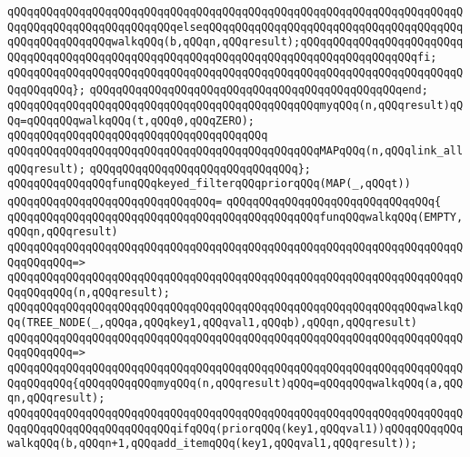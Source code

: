 \verb|qQQqqQQqqQQqqQQqqQQqqQQqqQQqqQQqqQQqqQQqqQQqqQQqqQQqqQQqqQQqqQQqqQQqqQQqqQQqqQQqqQQqqQQqqQQqqQQqelseqQQqqQQqqQQqqQQqqQQqqQQqqQQqqQQqqQQqqQQqqQQqqQQqqQQqqQQqwalkqQQq(b,qQQqn,qQQqresult);qQQqqQQqqQQqqQQqqQQqqQQqqQQqqQQqqQQqqQQqqQQqqQQqqQQqqQQqqQQqqQQqqQQqqQQqqQQqqQQqqQQqqQQqfi;|\newline
\verb|qQQqqQQqqQQqqQQqqQQqqQQqqQQqqQQqqQQqqQQqqQQqqQQqqQQqqQQqqQQqqQQqqQQqqQQqqQQqqQQq};|\newline
\verb|qQQqqQQqqQQqqQQqqQQqqQQqqQQqqQQqqQQqqQQqqQQqqQQqend;|\newline
\newline
\verb|qQQqqQQqqQQqqQQqqQQqqQQqqQQqqQQqqQQqqQQqqQQqqQQqmyqQQq(n,qQQqresult)qQQq=qQQqqQQqwalkqQQq(t,qQQq0,qQQqZERO);|\newline
\verb|qQQqqQQqqQQqqQQqqQQqqQQqqQQqqQQqqQQqqQQq|\newline
\verb|qQQqqQQqqQQqqQQqqQQqqQQqqQQqqQQqqQQqqQQqqQQqqQQqMAPqQQq(n,qQQqlink_allqQQqresult);|\newline
\verb|qQQqqQQqqQQqqQQqqQQqqQQqqQQqqQQq};|\newline
\newline
\verb|qQQqqQQqqQQqqQQqfunqQQqkeyed_filterqQQqpriorqQQq(MAP(_,qQQqt))|\newline
\verb|qQQqqQQqqQQqqQQqqQQqqQQqqQQqqQQq=|\newline
\verb|qQQqqQQqqQQqqQQqqQQqqQQqqQQqqQQq{|\newline
\verb|qQQqqQQqqQQqqQQqqQQqqQQqqQQqqQQqqQQqqQQqqQQqqQQqfunqQQqwalkqQQq(EMPTY,qQQqn,qQQqresult)|\newline
\verb|qQQqqQQqqQQqqQQqqQQqqQQqqQQqqQQqqQQqqQQqqQQqqQQqqQQqqQQqqQQqqQQqqQQqqQQqqQQqqQQq=>|\newline
\verb|qQQqqQQqqQQqqQQqqQQqqQQqqQQqqQQqqQQqqQQqqQQqqQQqqQQqqQQqqQQqqQQqqQQqqQQqqQQqqQQq(n,qQQqresult);|\newline
\newline
\verb|qQQqqQQqqQQqqQQqqQQqqQQqqQQqqQQqqQQqqQQqqQQqqQQqqQQqqQQqqQQqqQQqwalkqQQq(TREE_NODE(_,qQQqa,qQQqkey1,qQQqval1,qQQqb),qQQqn,qQQqresult)|\newline
\verb|qQQqqQQqqQQqqQQqqQQqqQQqqQQqqQQqqQQqqQQqqQQqqQQqqQQqqQQqqQQqqQQqqQQqqQQqqQQqqQQq=>|\newline
\verb|qQQqqQQqqQQqqQQqqQQqqQQqqQQqqQQqqQQqqQQqqQQqqQQqqQQqqQQqqQQqqQQqqQQqqQQqqQQqqQQq{qQQqqQQqqQQqmyqQQq(n,qQQqresult)qQQq=qQQqqQQqwalkqQQq(a,qQQqn,qQQqresult);|\newline
\newline
\verb|qQQqqQQqqQQqqQQqqQQqqQQqqQQqqQQqqQQqqQQqqQQqqQQqqQQqqQQqqQQqqQQqqQQqqQQqqQQqqQQqqQQqqQQqqQQqqQQqifqQQq(priorqQQq(key1,qQQqval1))qQQqqQQqqQQqwalkqQQq(b,qQQqn+1,qQQqadd_itemqQQq(key1,qQQqval1,qQQqresult));|\newline
